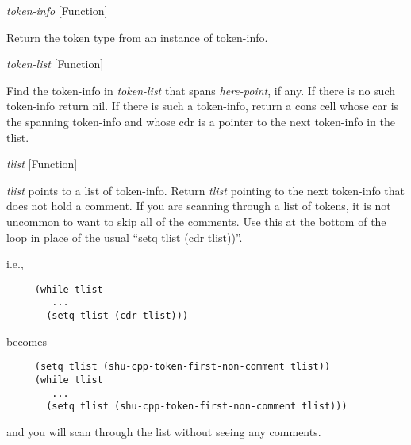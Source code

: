 \vspace{1em}
\noindent
{}
\usebox{\funcname}\emph{token-info}
 \hfill [Function]

\begin{doc-string}
Return the token type from an instance of token-info.
\end{doc-string}

\vspace{1em}
\noindent
{}
\usebox{\funcname}\emph{token-list}
 \hfill [Function]
\hspace*{\wd\funcname}

\begin{doc-string}
Find the token-info in \emph{token-list} that spans \emph{here-point}, if any.  If there
is no such token-info return nil.  If there is such a token-info, return a
cons cell whose car is the spanning token-info and whose cdr is a pointer
to the next token-info in the tlist.
\end{doc-string}

\vspace{1em}
\noindent
{}
\usebox{\funcname}\emph{tlist}
 \hfill [Function]

\begin{doc-string}
\emph{tlist} points to a list of token-info.  Return \emph{tlist} pointing to the next
token-info that does not hold a comment.  If you are scanning through a list
of tokens, it is not uncommon to want to skip all of the comments.  Use this
at the bottom of the loop in place of the usual ``setq tlist (cdr tlist))''.

i.e.,

\small{\begin{verbatim}
     (while tlist
        ...
       (setq tlist (cdr tlist)))
\end{verbatim}}

becomes

\small{\begin{verbatim}
     (setq tlist (shu-cpp-token-first-non-comment tlist))
     (while tlist
        ...
       (setq tlist (shu-cpp-token-first-non-comment tlist)))
\end{verbatim}}

and you will scan through the list without seeing any comments.
\end{doc-string}

